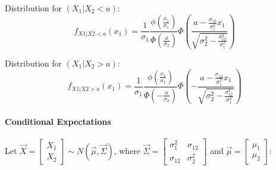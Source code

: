 \documentclass[a4paper]{article}
\numberwithin{equation}{subsection}
\begin{document}
Distribution for $(X_{1}|X_{2} < a)$:
\begin{equation}
  f_{X1|X2 < a}(x_{1}) = 
  \frac{1}{\sigma_{1}}
  \frac{\phi \left( \frac{x_{1}}{\sigma_{1}} \right)}
  {\Phi \left( \frac{a}{\sigma_{2}} \right)}
  \Phi \left(
    \frac{a - \frac{\sigma_{12}}{\sigma_{1}^{2}} x_{1}}
    {\sqrt{\sigma_{2}^{2} - \frac{\sigma_{12}^{2}}{\sigma_{1}^{2}}}}
  \right)
\end{equation}

Distribution for $(X_{1}|X_{2} > a)$:
\begin{equation}
  f_{X1|X2 > a}(x_{1}) = 
  \frac{1}{\sigma_{1}}
  \frac{\phi \left( \frac{x_{1}}{\sigma_{1}} \right)}
  {\Phi \left( -\frac{a}{\sigma_{2}} \right)}
  \Phi \left(
    - \frac{a - \frac{\sigma_{12}}{\sigma_{1}^{2}} x_{1}}
    {\sqrt{\sigma_{2}^{2} - \frac{\sigma_{12}^{2}}{\sigma_{1}^{2}}}}
  \right)
\end{equation}

\paragraph{Conditional Expectations}
Let
\begin{math}
  \vec{X}=
  \begin{bmatrix}
    X_1\\
    X_2
  \end{bmatrix}
  \sim
  N(\vec{\mu}, \vec{\Sigma})
\end{math}, where
\begin{math}
\vec{\Sigma} = \left[
 \begin{array}{rr} \sigma_1^2 & \sigma_{12}\\ \sigma_{12} & \sigma_2^2
 \end{array}\right]
\end{math} and
\begin{math}
\vec{\mu}=\left[\begin{array}{r} \mu_1\\
 \mu_2\end{array}\right]
\end{math}:
\end{document}
